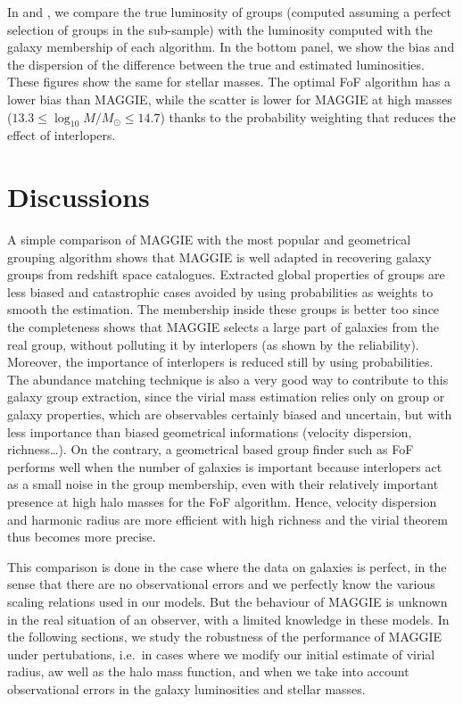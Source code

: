 In  and , we compare the
true luminosity of groups (computed assuming a perfect selection of groups in
the sub-sample) with the luminosity computed with the galaxy membership of each
algorithm. In the bottom panel, we show the bias and the dispersion of the
difference between the true and estimated luminosities. These figures show the
same for stellar masses. The optimal FoF algorithm has a lower bias than
MAGGIE, while the scatter is lower for MAGGIE at high masses ($13.3\leqslant
\log_{10}M/M_\odot\leqslant 14.7$) thanks to the probability weighting that
reduces the effect of interlopers.

\section{Discussions}
\label{sec:maggie_discussions}

A simple comparison of MAGGIE with the most popular and geometrical grouping
algorithm shows that MAGGIE is well adapted in recovering galaxy groups from
redshift space catalogues. Extracted global properties of groups are less
biased and catastrophic cases avoided by using probabilities as weights to
smooth the estimation. The membership inside these groups is better too since
the completeness shows that MAGGIE selects a large part of galaxies from the
real group, without polluting it by interlopers (as shown by the reliability).
Moreover, the importance of interlopers is reduced still by using
probabilities. The abundance matching technique is also a very good way to
contribute to this galaxy group extraction, since the virial mass estimation
relies only on group or galaxy properties, which are observables certainly
biased and uncertain, but with less importance than biased geometrical
informations (velocity dispersion, richness\ldots). On the contrary, a
geometrical based group finder such as FoF performs well when the number of
galaxies is important because interlopers act as a small noise in the group
membership, even with their relatively important presence at high halo masses
for the FoF algorithm. Hence, velocity dispersion and harmonic radius are more
efficient with high richness and the virial theorem thus becomes more precise.

This comparison is done in the case where the data on galaxies is perfect, in
the sense that there are no observational errors and we perfectly know the
various scaling relations used in our models. But the behaviour of MAGGIE is
unknown in the real situation of an observer, with a limited knowledge in these
models. In the following sections, we study the robustness of the performance
of MAGGIE under pertubations, i.e.\ in cases where we modify our initial
estimate of virial radius, aw well as the halo mass function, and when we take
into account observational errors in the galaxy luminosities and stellar
masses.

